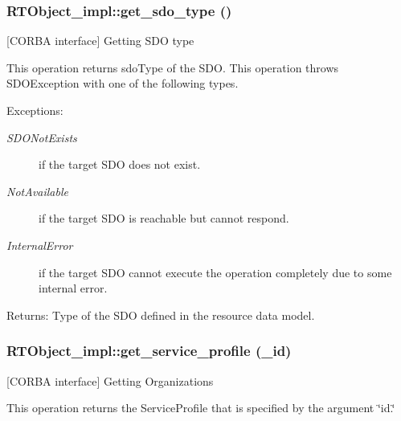 \subsubsection{\setlength{\rightskip}{0pt plus 5cm}RTObject\_\-impl::get\_\-sdo\_\-type ()}\label{classRTObject__impl_RTObject__impla38}


[CORBA interface] Getting SDO type 

This operation returns sdo\-Type of the SDO. This operation throws SDOException with one of the following types.

\begin{Desc}
\item[Exceptions:]
\begin{description}
\item[{\em SDONot\-Exists}]if the target SDO does not exist. \item[{\em Not\-Available}]if the target SDO is reachable but cannot respond. \item[{\em Internal\-Error}]if the target SDO cannot execute the operation completely due to some internal error. \end{description}
\end{Desc}
\begin{Desc}
\item[Returns:]Type of the SDO defined in the resource data model.\end{Desc}
\subsubsection{\setlength{\rightskip}{0pt plus 5cm}RTObject\_\-impl::get\_\-service\_\-profile (\_\-id)}\label{classRTObject__impl_RTObject__impla41}


[CORBA interface] Getting Organizations 

This operation returns the Service\-Profile that is specified by the argument \char`\"{}id.\char`\"{}

